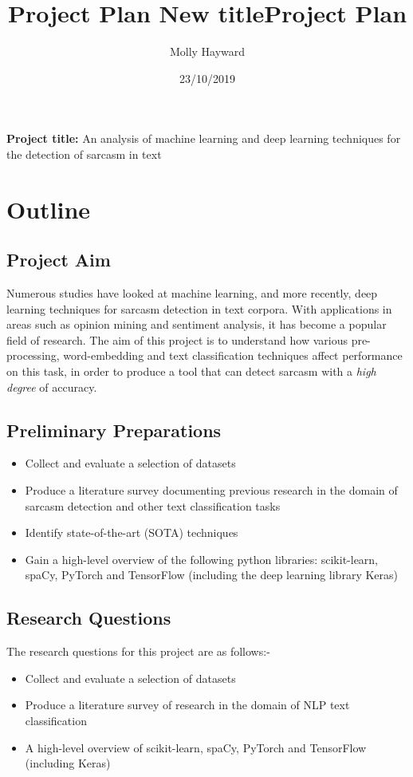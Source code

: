 \documentclass[12pt,a4paper]{article}
\title{Project Plan \large \newline 
New title}
\title{Project Plan}
\author{Molly Hayward}
\date{23/10/2019}
\begin{document}
\maketitle

\noindent \textbf{Project title:} An analysis of machine learning and deep learning techniques for the detection of sarcasm in text

\section{Outline}
\subsection{Project Aim}
\noindent Numerous studies have looked at machine learning, and more recently, deep learning  techniques for sarcasm detection in text corpora. With applications in areas such as opinion mining and sentiment analysis, it has become a popular field of research. The aim of this project is to understand how various pre-processing, word-embedding and text classification techniques affect performance on this task, in order to produce a tool that can detect sarcasm with a \textit{high degree} of accuracy.

\subsection{Preliminary Preparations}
\begin{itemize}
	\setlength\itemsep{0em}
	\item Collect and evaluate a selection of datasets
	\item Produce a literature survey documenting previous research in the domain of sarcasm detection and other text classification tasks
	\item Identify state-of-the-art (SOTA) techniques
	\item Gain a high-level overview of the following python libraries: scikit-learn, spaCy, PyTorch and TensorFlow (including the deep learning library Keras)
\end{itemize}



\subsection{Research Questions}
The research questions for this project are as follows:-
\begin{itemize}
	\setlength\itemsep{0em}
	\item Collect and evaluate a selection of datasets
	\item Produce a literature survey of research in the domain of NLP text classification
	\item A high-level overview of scikit-learn, spaCy, PyTorch and TensorFlow (including Keras)
\end{itemize}
\end{document}
